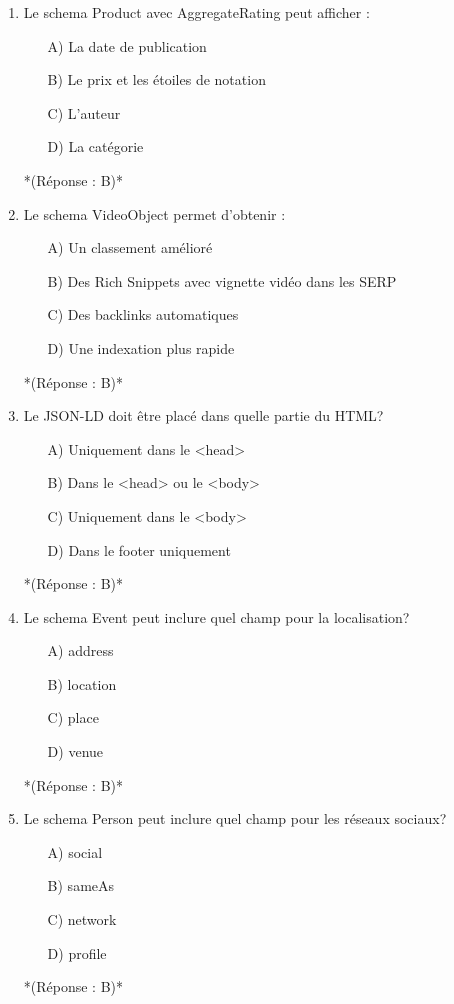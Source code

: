 \documentclass[12pt,a4paper,twoside]{report}
\begin{document}
\begin{enumerate}
\item Le schema Product avec AggregateRating peut afficher :
\begin{itemize}
\item[A)] La date de publication
\item[B)] Le prix et les étoiles de notation
\item[C)] L'auteur
\item[D)] La catégorie
\end{itemize}
*(Réponse : B)*

\item Le schema VideoObject permet d'obtenir :
\begin{itemize}
\item[A)] Un classement amélioré
\item[B)] Des Rich Snippets avec vignette vidéo dans les SERP
\item[C)] Des backlinks automatiques
\item[D)] Une indexation plus rapide
\end{itemize}
*(Réponse : B)*

\item Le JSON-LD doit être placé dans quelle partie du HTML?
\begin{itemize}
\item[A)] Uniquement dans le <head>
\item[B)] Dans le <head> ou le <body>
\item[C)] Uniquement dans le <body>
\item[D)] Dans le footer uniquement
\end{itemize}
*(Réponse : B)*

\item Le schema Event peut inclure quel champ pour la localisation?
\begin{itemize}
\item[A)] address
\item[B)] location
\item[C)] place
\item[D)] venue
\end{itemize}
*(Réponse : B)*

\item Le schema Person peut inclure quel champ pour les réseaux sociaux?
\begin{itemize}
\item[A)] social
\item[B)] sameAs
\item[C)] network
\item[D)] profile
\end{itemize}
*(Réponse : B)*


\end{enumerate}
\end{document}
